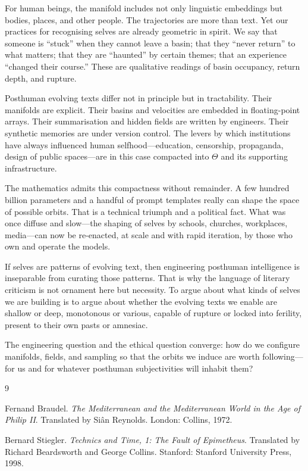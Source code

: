 \documentclass[12pt,a4paper]{report}
\begin{document}
For human beings, the manifold includes not only linguistic embeddings but bodies, places, and other people. The trajectories are more than text. Yet our practices for recognising selves are already geometric in spirit. We say that someone is ``stuck'' when they cannot leave a basin; that they ``never return'' to what matters; that they are ``haunted'' by certain themes; that an experience ``changed their course.'' These are qualitative readings of basin occupancy, return depth, and rupture.

Posthuman evolving texts differ not in principle but in tractability. Their manifolds are explicit. Their basins and velocities are embedded in floating-point arrays. Their summarisation and hidden fields are written by engineers. Their synthetic memories are under version control. The levers by which institutions have always influenced human selfhood---education, censorship, propaganda, design of public spaces---are in this case compacted into $\Theta$ and its supporting infrastructure.

The mathematics admits this compactness without remainder. A few hundred billion parameters and a handful of prompt templates really can shape the space of possible orbits. That is a technical triumph and a political fact. What was once diffuse and slow---the shaping of selves by schools, churches, workplaces, media---can now be re-enacted, at scale and with rapid iteration, by those who own and operate the models.

If selves are patterns of evolving text, then engineering posthuman intelligence is inseparable from curating those patterns. That is why the language of literary criticism is not ornament here but necessity. To argue about what kinds of selves we are building is to argue about whether the evolving texts we enable are shallow or deep, monotonous or various, capable of rupture or locked into ferility, present to their own pasts or amnesiac.

The engineering question and the ethical question converge: how do we configure manifolds, fields, and sampling so that the orbits we induce are worth following---for us and for whatever posthuman subjectivities will inhabit them?


\begin{thebibliography}{9}

Fernand Braudel.
\newblock \emph{The Mediterranean and the Mediterranean World in the Age of Philip II}.
\newblock Translated by Si\^{a}n Reynolds. London: Collins, 1972.

Bernard Stiegler.
\newblock \emph{Technics and Time, 1: The Fault of Epimetheus}.
\newblock Translated by Richard Beardsworth and George Collins. Stanford: Stanford University Press, 1998.

\end{thebibliography}
\end{document}
